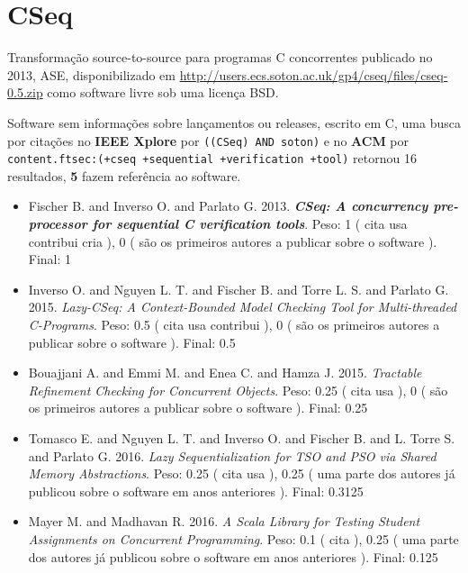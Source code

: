 \section{CSeq}

Transformação source-to-source para programas C concorrentes
publicado no 2013, ASE,
disponibilizado em \url{http://users.ecs.soton.ac.uk/gp4/cseq/files/cseq-0.5.zip}
como software livre
sob uma licença BSD.

Software sem informações sobre lançamentos ou releases,
escrito em C,
uma busca por citações no {\bf IEEE Xplore} por
\texttt{((CSeq) AND soton)}
e no {\bf ACM} por
\texttt{content.ftsec:(+cseq +sequential +verification +tool)}
retornou
16 resultados,
{\bf 5} fazem referência ao software.

\begin{itemize}
\item Fischer B. and Inverso O. and Parlato G.
      2013.
        \textbf{\textit{ CSeq: A concurrency pre-processor for sequential C verification tools}}.
      Peso:
      1 (
          cita
          usa
          contribui
          cria
      ),
      0 (
são os primeiros autores a publicar sobre o software
      ).
      Final:
      1

\item Inverso O. and Nguyen L. T. and Fischer B. and Torre L. S. and Parlato G.
      2015.
        \textit{ Lazy-CSeq: A Context-Bounded Model Checking Tool for Multi-threaded C-Programs}.
      Peso:
      0.5 (
          cita
          usa
          contribui
      ),
      0 (
são os primeiros autores a publicar sobre o software
      ).
      Final:
      0.5

\item Bouajjani A. and Emmi M. and Enea C. and Hamza J.
      2015.
        \textit{ Tractable Refinement Checking for Concurrent Objects}.
      Peso:
      0.25 (
          cita
          usa
      ),
      0 (
são os primeiros autores a publicar sobre o software
      ).
      Final:
      0.25

\item Tomasco E. and Nguyen L. T. and Inverso O. and Fischer B. and L. Torre S. and Parlato G.
      2016.
        \textit{ Lazy Sequentialization for TSO and PSO via Shared Memory Abstractions}.
      Peso:
      0.25 (
          cita
          usa
      ),
      0.25 (
uma parte dos autores já publicou sobre o software em anos anteriores
      ).
      Final:
      0.3125

\item Mayer M. and Madhavan R.
      2016.
        \textit{ A Scala Library for Testing Student Assignments on Concurrent Programming}.
      Peso:
      0.1 (
          cita
      ),
      0.25 (
uma parte dos autores já publicou sobre o software em anos anteriores
      ).
      Final:
      0.125

\end{itemize}

